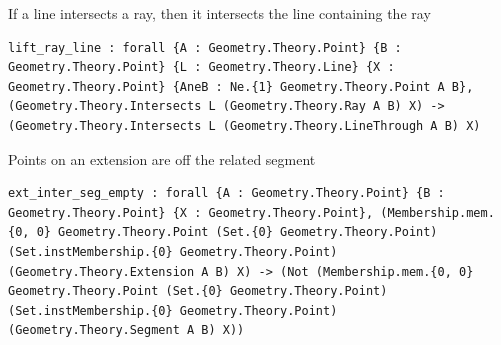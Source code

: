 \begin{theorem}
  \label{Geometry.Theory.Intersection.lift_ray_line}
  \leanok
  If a line intersects a ray, then it intersects the line containing the ray 
\begin{verbatim}lift_ray_line : forall {A : Geometry.Theory.Point} {B : Geometry.Theory.Point} {L : Geometry.Theory.Line} {X : Geometry.Theory.Point} {AneB : Ne.{1} Geometry.Theory.Point A B}, (Geometry.Theory.Intersects L (Geometry.Theory.Ray A B) X) -> (Geometry.Theory.Intersects L (Geometry.Theory.LineThrough A B) X)\end{verbatim}
\end{theorem}

\begin{theorem}
  \label{Geometry.Theory.Intersection.ext_inter_seg_empty}
  \leanok
  Points on an extension are off the related segment 
\begin{verbatim}ext_inter_seg_empty : forall {A : Geometry.Theory.Point} {B : Geometry.Theory.Point} {X : Geometry.Theory.Point}, (Membership.mem.{0, 0} Geometry.Theory.Point (Set.{0} Geometry.Theory.Point) (Set.instMembership.{0} Geometry.Theory.Point) (Geometry.Theory.Extension A B) X) -> (Not (Membership.mem.{0, 0} Geometry.Theory.Point (Set.{0} Geometry.Theory.Point) (Set.instMembership.{0} Geometry.Theory.Point) (Geometry.Theory.Segment A B) X))\end{verbatim}
\end{theorem}


